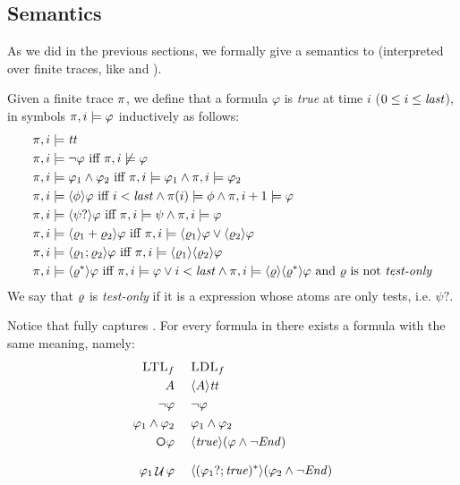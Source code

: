 \subsection{Semantics}
As we did in the previous sections, we formally give a semantics to \LDLf (interpreted over finite traces, like \LTLf and \REGEX).

\begin{definition}
	Given a finite trace $\pi$, we define that a \LDLf formula $\varphi$ is \emph{true} at time $i$ ($0 \le i \le \mathit{last}$), in symbols $\pi, i \models \varphi$ inductively as follows:
	\begin{align*}
	\pi, i &\models {\mathit{tt}}\nonumber\\
	\pi, i &\models \lnot \varphi \ \text{iff}\  \pi, i \not\models \varphi\nonumber\\
	\pi, i &\models \varphi_1 \wedge \varphi_2 \ \text{iff}\  \pi, i \models \varphi_1 \wedge \pi, i \models \varphi_2\nonumber\\
	\pi, i &\models \langle \phi \rangle\varphi \ \text{iff}\  i<\mathit{last} \wedge \pi(i) \models \phi \wedge \pi, i+1 \models \varphi\\
	\pi, i &\models \langle \psi? \rangle\varphi \ \text{iff}\  \pi, i \models \psi \wedge \pi, i \models \varphi\\
	\pi, i &\models \langle \varrho_1 + \varrho_2 \rangle\varphi \ \text{iff}\  \pi, i \models \langle \varrho_1 \rangle\varphi \vee \langle \varrho_2 \rangle\varphi\\
	\pi, i &\models \langle \varrho_1 ; \varrho_2 \rangle\varphi \ \text{iff}\  \pi, i \models \langle \varrho_1 \rangle\langle \varrho_2 \rangle\varphi\\
	\pi, i &\models \langle \varrho^* \rangle\varphi \ \text{iff}\  \pi, i \models \varphi
	\vee i<\mathit{last} \wedge \pi, i \models \langle \varrho \rangle\langle \varrho^* \rangle\varphi \text{ and $\varrho$ is not \emph{test-only}}
	\end{align*}
	We say that $\varrho$ is \emph{test-only} if it is a \RE expression whose atoms are only tests, i.e. $\psi?$.
\end{definition}

Notice that \LDLf fully captures \LTLf. For every formula in \LTLf there exists a \LDLf formula with the same meaning, namely:
\begin{align*}
	\textsc{LTL}_f &\ind \textsc{LDL}_f\\
	A  &\ind  \DIAM{A}\ttrue\\
	\lnot \varphi &\ind \lnot \varphi\\
	\varphi_1 \lAND \varphi_2 &\ind \varphi_1 \lAND \varphi_2\\
	\Next \varphi &\ind \DIAM{\true}(\varphi \lAND \lnot\Ended)\\
	\varphi_1 \lUntil \varphi &\ind \DIAM{(\varphi_1?; \true)^*}(\varphi_2 \lAND\lnot \Ended)
\end{align*}

